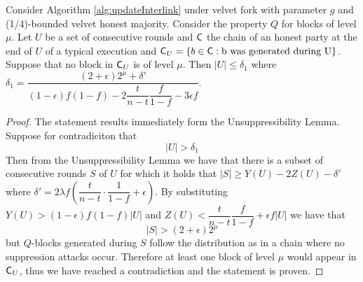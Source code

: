 \begin{lemma}\label{lem:claim1_lemma}
    Consider Algorithm \ref{alg:updateInterlink} under velvet fork with parameter $g$ and (1/4)-bounded velvet honest majority. Consider the  property $Q$ for blocks of level $\mu$. Let $U$ be a set of consecutive rounds and $\mathsf{C}$ the chain of an honest party at the end of $U$ of a typical execution and $\mathsf{C}_U = \{ b \in \mathsf{C}: \text{b was generated during U} \}$. Suppose that no block in $\mathsf{C}_U$ is of level $\mu$. Then $\lvert U \rvert \leq \delta_1$ where 
    $\delta_1 = \dfrac{(2+\epsilon) 2^{\mu} + \delta'}{(1-\epsilon)f(1-f) - 2\dfrac{t}{n-t}\dfrac{f}{1-f} -3\epsilon f}$.
\end{lemma}
\begin{proof}
    The statement results immediately form the Unsuppressibility Lemma. Suppose for contradiciton that
    \begin{equation*}
        \lvert U \rvert > \delta_1
    \end{equation*} 
    Then from the Unsuppressibility Lemma we have that there is a subset of consecutive rounds $S$ of $U$ for which it holds that
    $\lvert S \rvert \geq Y(U) - 2Z(U) - \delta'$ where
    $\delta' = 2 \lambda f (\dfrac{t}{n-t} \cdot \dfrac{1}{1-f} + \epsilon)$. By substituting 
    $Y(U) > (1-\epsilon)f(1-f) \lvert U \rvert$ and
    $Z(U) < \dfrac{t}{n-t} \dfrac{f}{1-f} +\epsilon f \lvert U \rvert$ we have that
    \begin{equation*}
        \lvert S \rvert > (2+\epsilon)2^{\mu}
    \end{equation*}
    but $Q$-blocks generated during $S$ follow the distribution as in a chain where no suppression attacks occur. Therefore at least one block of level $\mu$ would appear in $\mathsf{C}_U$, thus we have reached a contradiction and the statement is proven.
\end{proof}


